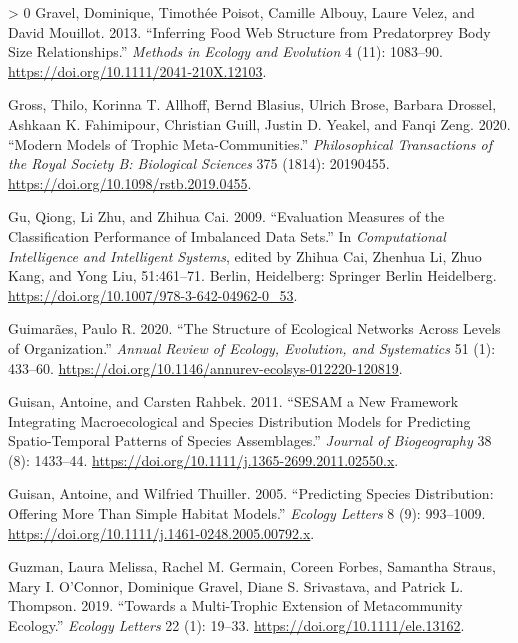 \documentclass[11pt]{article}
\newlength{\cslhangindent}
\newenvironment{CSLReferences}[3] %
 {%
  \setlength{\parindent}{0pt}
  \ifodd #1 \everypar{\setlength{\hangindent}{\cslhangindent}}\ignorespaces\fi
  \ifnum #2 > 0
  \setlength{\parskip}{#2\baselineskip}
  \fi
 }%
 {}
\begin{document}
\begin{CSLReferences}{1}{0}
\leavevmode\hypertarget{ref-Gravel2013InfFoo}{}%
Gravel, Dominique, Timothée Poisot, Camille Albouy, Laure Velez, and
David Mouillot. 2013. {``Inferring Food Web Structure from Predatorprey
Body Size Relationships.''} \emph{Methods in Ecology and Evolution} 4
(11): 1083--90. \url{https://doi.org/10.1111/2041-210X.12103}.

\leavevmode\hypertarget{ref-Gross2020ModMod}{}%
Gross, Thilo, Korinna T. Allhoff, Bernd Blasius, Ulrich Brose, Barbara
Drossel, Ashkaan K. Fahimipour, Christian Guill, Justin D. Yeakel, and
Fanqi Zeng. 2020. {``Modern Models of Trophic Meta-Communities.''}
\emph{Philosophical Transactions of the Royal Society B: Biological
Sciences} 375 (1814): 20190455.
\url{https://doi.org/10.1098/rstb.2019.0455}.

\leavevmode\hypertarget{ref-Gu2009EvaMea}{}%
Gu, Qiong, Li Zhu, and Zhihua Cai. 2009. {``Evaluation Measures of the
Classification Performance of Imbalanced Data Sets.''} In
\emph{Computational Intelligence and Intelligent Systems}, edited by
Zhihua Cai, Zhenhua Li, Zhuo Kang, and Yong Liu, 51:461--71. Berlin,
Heidelberg: Springer Berlin Heidelberg.
\url{https://doi.org/10.1007/978-3-642-04962-0_53}.

\leavevmode\hypertarget{ref-Guimaraes2020StrEco}{}%
Guimarães, Paulo R. 2020. {``The Structure of Ecological Networks Across
Levels of Organization.''} \emph{Annual Review of Ecology, Evolution,
and Systematics} 51 (1): 433--60.
\url{https://doi.org/10.1146/annurev-ecolsys-012220-120819}.

\leavevmode\hypertarget{ref-Guisan2011SesNew}{}%
Guisan, Antoine, and Carsten Rahbek. 2011. {``SESAM a New Framework
Integrating Macroecological and Species Distribution Models for
Predicting Spatio-Temporal Patterns of Species Assemblages.''}
\emph{Journal of Biogeography} 38 (8): 1433--44.
\url{https://doi.org/10.1111/j.1365-2699.2011.02550.x}.

\leavevmode\hypertarget{ref-Guisan2005PreSpe}{}%
Guisan, Antoine, and Wilfried Thuiller. 2005. {``Predicting Species
Distribution: Offering More Than Simple Habitat Models.''} \emph{Ecology
Letters} 8 (9): 993--1009.
\url{https://doi.org/10.1111/j.1461-0248.2005.00792.x}.

\leavevmode\hypertarget{ref-Guzman2019MulExt}{}%
Guzman, Laura Melissa, Rachel M. Germain, Coreen Forbes, Samantha
Straus, Mary I. O'Connor, Dominique Gravel, Diane S. Srivastava, and
Patrick L. Thompson. 2019. {``Towards a Multi-Trophic Extension of
Metacommunity Ecology.''} \emph{Ecology Letters} 22 (1): 19--33.
\url{https://doi.org/10.1111/ele.13162}.


\end{CSLReferences}
\end{document}
